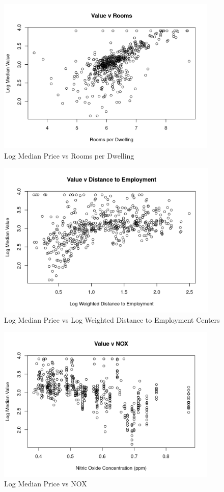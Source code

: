 \documentclass[11pt]{article}
\begin{document}
\begin{figure}[h!] 
  \centering
  \includegraphics[height=75mm]{rooms.png}
  \caption{Log Median Price vs Rooms per Dwelling}
  \label{fig:rooms}
\end{figure}

\begin{figure}[h!] 
  \centering
  \includegraphics[height=75mm]{employment.png}
  \caption{Log Median Price vs Log Weighted Distance to Employment Centers}
  \label{fig:employment}
\end{figure}

\begin{figure}[h!] 
	\centering
  \includegraphics[height=75mm]{nox.png}
  \caption{Log Median Price vs NOX}
  \label{fig:nox}
\end{figure}
\end{document}
